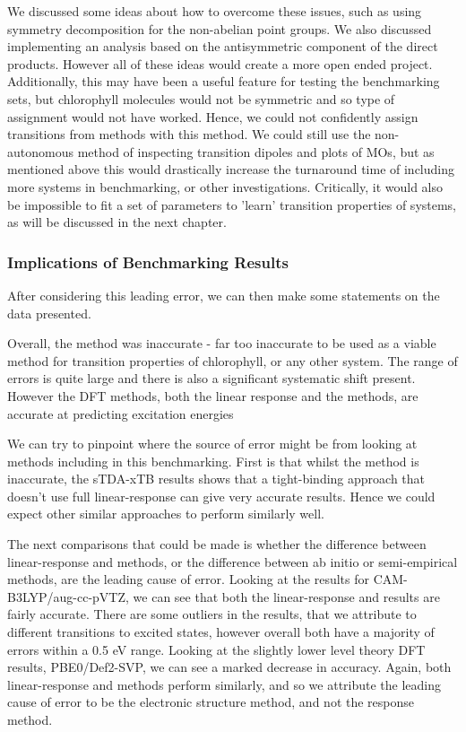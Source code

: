 We discussed some ideas about how to overcome these issues, such as using symmetry
decomposition for the non-abelian point groups. We also discussed implementing an
analysis based on the antisymmetric component of the direct products. However all
of these ideas would create a more open ended project. Additionally, this may have
been a useful feature for testing the benchmarking sets, but chlorophyll molecules 
would not be symmetric and so type of assignment would not have worked. 
Hence, we could not confidently assign transitions from \dscf methods with this method.
We could still use the non-autonomous method of inspecting transition dipoles and
plots of MOs, but as mentioned above this would drastically increase the turnaround
time of including more systems in benchmarking, or other investigations.
Critically, it would also be impossible to fit a set of parameters to 'learn' transition
properties of systems, as will be discussed in the next chapter.

\subsubsection{Implications of Benchmarking Results}
\label{subsubsec:imp_of_benchmarking}

After considering this leading error, we can then make some statements on the
data presented.

Overall, the \dxtb method was inaccurate - far too inaccurate to be used as a 
viable method for transition properties of chlorophyll, or any other system.
The range of errors is quite large and there is also a significant systematic shift 
present. However the DFT methods, both the linear response and the \dscf methods,
are accurate at predicting excitation energies

We can try to pinpoint where the source of error might be from looking at methods
including in this benchmarking. First is that whilst the \dxtb method is inaccurate,
the sTDA-xTB results shows that a tight-binding approach that doesn't use full
linear-response can give very accurate results. Hence we could expect other similar
approaches to perform similarly well.

The next comparisons that could be made is whether the difference between 
linear-response and \dscf methods, or the difference between ab initio or 
semi-empirical methods, are the leading cause of error. Looking at the results 
for CAM-B3LYP/aug-cc-pVTZ, we can see that both the linear-response and \dscf 
results are fairly accurate. There are some outliers in the \dscf results, that 
we attribute to different transitions to excited states, however overall both 
have a majority of errors within a 0.5 eV range. Looking at the slightly lower
level theory DFT results, PBE0/Def2-SVP, we can see a marked decrease in accuracy.
Again, both linear-response and \dscf methods perform similarly, and so we attribute
the leading cause of error to be the electronic structure method, and not the response method.

